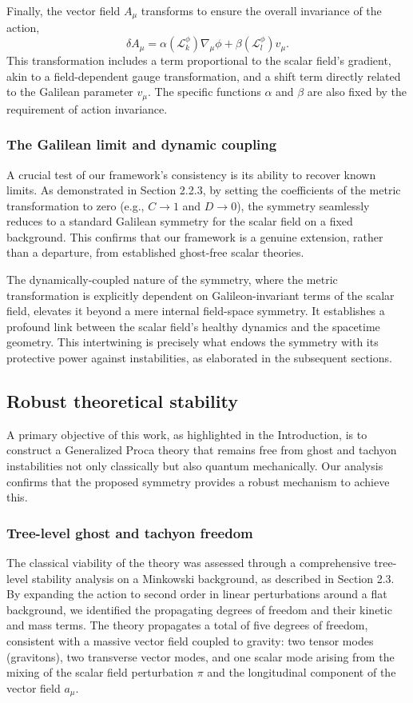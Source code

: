 \documentclass[twocolumn]{aastex631}
\begin{document}
Finally, the vector field $A_\mu$ transforms to ensure the overall invariance of the action,
\begin{equation}
\delta A_\mu = \alpha(\mathcal{L}_k^\phi) \nabla_\mu \phi + \beta(\mathcal{L}_l^\phi) v_\mu.
\end{equation}
This transformation includes a term proportional to the scalar field's gradient, akin to a field-dependent gauge transformation, and a shift term directly related to the Galilean parameter $v_\mu$. The specific functions $\alpha$ and $\beta$ are also fixed by the requirement of action invariance.

\subsubsection{The Galilean limit and dynamic coupling}
A crucial test of our framework's consistency is its ability to recover known limits. As demonstrated in Section 2.2.3, by setting the coefficients of the metric transformation to zero (e.g., $C \to 1$ and $D \to 0$), the symmetry seamlessly reduces to a standard Galilean symmetry for the scalar field on a fixed background. This confirms that our framework is a genuine extension, rather than a departure, from established ghost-free scalar theories.

The dynamically-coupled nature of the symmetry, where the metric transformation is explicitly dependent on Galileon-invariant terms of the scalar field, elevates it beyond a mere internal field-space symmetry. It establishes a profound link between the scalar field's healthy dynamics and the spacetime geometry. This intertwining is precisely what endows the symmetry with its protective power against instabilities, as elaborated in the subsequent sections.

\subsection{Robust theoretical stability}

A primary objective of this work, as highlighted in the Introduction, is to construct a Generalized Proca theory that remains free from ghost and tachyon instabilities not only classically but also quantum mechanically. Our analysis confirms that the proposed symmetry provides a robust mechanism to achieve this.

\subsubsection{Tree-level ghost and tachyon freedom}
The classical viability of the theory was assessed through a comprehensive tree-level stability analysis on a Minkowski background, as described in Section 2.3. By expanding the action to second order in linear perturbations around a flat background, we identified the propagating degrees of freedom and their kinetic and mass terms. The theory propagates a total of five degrees of freedom, consistent with a massive vector field coupled to gravity: two tensor modes (gravitons), two transverse vector modes, and one scalar mode arising from the mixing of the scalar field perturbation $\pi$ and the longitudinal component of the vector field $a_\mu$.
\end{document}
